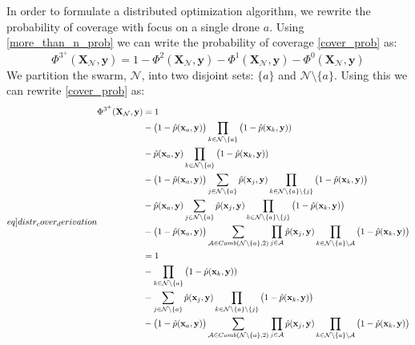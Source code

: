 In order to formulate a distributed optimization algorithm, we rewrite the probability of coverage with focus on a single drone $a$.
Using \eqref{more_than_n_prob} we can write the probability of coverage \eqref{cover_prob} as:
\begin{equation}
  \Phi^{3^{+}}(\mathbf{X}_{\mathcal{N}}, \mathbf{y}) = 1 - \Phi^{2}(\mathbf{X}_{\mathcal{N}}, \mathbf{y}) - \Phi^{1}(\mathbf{X}_{\mathcal{N}}, \mathbf{y}) - \Phi^{0}(\mathbf{X}_{\mathcal{N}}, \mathbf{y})
\end{equation}
We partition the swarm, $\mathcal{N}$, into two disjoint sets: $\{a\}$ and $\mathcal{N}\setminus\{a\}$. Using this we can rewrite \eqref{cover_prob} as:
\begin{equation}\label[eq]{distr_cover_derivation}
  \begin{split}
    \Phi^{3^{+}}(\mathbf{X}_{\mathcal{N}}, \mathbf{y}) &= 1\\
    &- \big(1-\hat{p}(\mathbf{x}_{a}, \mathbf{y})\big)\prod_{k\in\mathcal{N}\setminus\{a\}}\big(1-\hat{p}(\mathbf{x}_{k}, \mathbf{y}))\\
    &- \hat{p}(\mathbf{x}_{a}, \mathbf{y})\prod_{k\in\mathcal{N}\setminus\{a\}}\big(1-\hat{p}(\mathbf{x}_{k}, \mathbf{y}))\\
    &- \big(1-\hat{p}(\mathbf{x}_{a}, \mathbf{y})\big)\sum_{j\in\mathcal{N}\setminus\{a\}}\hat{p}(\mathbf{x}_{j}, \mathbf{y})\prod_{k\in\mathcal{N}\setminus\{a\}\setminus\{j\}}\big(1-\hat{p}(\mathbf{x}_{k}, \mathbf{y})\big)\\
    &- \hat{p}(\mathbf{x}_{a}, \mathbf{y})\sum_{j\in \mathcal{N}\setminus\{a\}}\hat{p}(\mathbf{x}_{j}, \mathbf{y})\prod_{k\in\mathcal{N}\setminus\{a\}\setminus\{j\}}\big(1-\hat{p}(\mathbf{x}_{k}, \mathbf{y})\big)\\
    &- \big(1-\hat{p}(\mathbf{x}_{a}, \mathbf{y})\big)\sum_{\mathcal{A}\in Comb(\mathcal{N}\setminus\{a\}, 2)}\prod_{j\in\mathcal{A}}\hat{p}(\mathbf{x}_{j}, \mathbf{y})\prod_{k\in\mathcal{N}\setminus\{a\}\setminus\mathcal{A}}\big(1-\hat{p}(\mathbf{x}_{k}, \mathbf{y})\big)\\
    &= 1\\
    &- \prod_{k\in\mathcal{N}\setminus\{a\}}\big(1-\hat{p}(\mathbf{x}_{k}, \mathbf{y}))\\
    &- \sum_{j\in\mathcal{N}\setminus\{a\}}\hat{p}(\mathbf{x}_{j}, \mathbf{y})\prod_{k\in\mathcal{N}\setminus\{a\}\setminus\{j\}}\big(1-\hat{p}(\mathbf{x}_{k}, \mathbf{y})\big)\\
    &- \big(1-\hat{p}(\mathbf{x}_{a}, \mathbf{y})\big)\sum_{\mathcal{A}\in Comb(\mathcal{N}\setminus\{a\}, 2)}\prod_{j\in\mathcal{A}}\hat{p}(\mathbf{x}_{j}, \mathbf{y})\prod_{k\in\mathcal{N}\setminus\{a\}\setminus\mathcal{A}}\big(1-\hat{p}(\mathbf{x}_{k}, \mathbf{y})\big)\\
  \end{split}
\end{equation}
